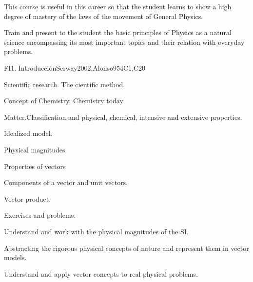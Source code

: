 \begin{syllabus}


\begin{justification}
This course is useful in this career so that the student learns to show a high degree of mastery of the laws of the movement of General Physics.
\end{justification}

\begin{goals}
\item Train and present to the student the basic principles of Physics as a natural science encompassing its most important topics and their relation  with everyday problems.
\end{goals}

\begin{outcomes}
  \item {}
  \item {}
  \item {}
\end{outcomes}

\begin{competences}
    \item {}
    \item {}
\end{competences}

\begin{unit}{FI1. Introducción}{}{Serway2002,Alonso95}{4}{C1,C20}
\begin{topics}
      \item Scientific research. The cientific method.
      \item Concept of Chemistry. Chemistry today
      \item Matter.Classification and physical, chemical, intensive and extensive properties. 
      \item Idealized model.
      \item Physical magnitudes.
      \item Properties of vectors
      \item Components of a vector and unit vectors.
      \item Vector product.
      \item Exercises and problems.
   \end{topics}

   \begin{learningoutcomes}
      \item Understand and work with the physical magnitudes of the SI.
      \item Abstracting the rigorous physical concepts of nature and represent them in vector models.
      \item Understand and apply vector concepts to real physical problems.
   \end{learningoutcomes}
\end{unit}


\end{syllabus}
